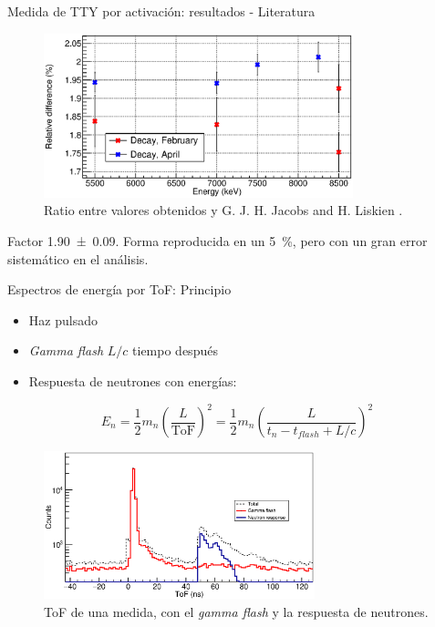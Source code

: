 \documentclass[11pt]{beamer}
\begin{document}
\begin{frame}{Medida de TTY por activación: resultados - Literatura}
	\begin{figure}[H]
		\centering
		\includegraphics[width=0.80\textwidth]{activation_result_diffs.eps}
		\caption{Ratio entre valores obtenidos y G. J. H. Jacobs and H. Liskien \cite{jacobs}.}
		\label{activation_final_results}
	\end{figure}
	Factor \num{1.90(9)}. Forma reproducida en un \qty{5}{\percent}, pero con un gran error sistemático en el análisis.
\end{frame}






\begin{frame}{Espectros de energía por ToF: Principio}
	\begin{itemize}
		\item Haz pulsado
		\item \textit{Gamma flash} $L/c$ tiempo después
		\item Respuesta de neutrones con energías:
	\end{itemize}
	\begin{equation}
		E_n=\frac{1}{2} m_n \left( \frac{L}{\text{ToF}} \right)^2 = \frac{1}{2} m_n \left( \frac{L}{t_n - t_{flash} + L/c} \right)^2
	\end{equation}
	\begin{figure}[H]
		\centering
		\includegraphics[width=0.70\textwidth]{separated_tof.eps}
		\caption{ToF de una medida, con el \textit{gamma flash} y la respuesta de neutrones.}
		\label{separated_tof}
	\end{figure}
\end{frame}
\end{document}
